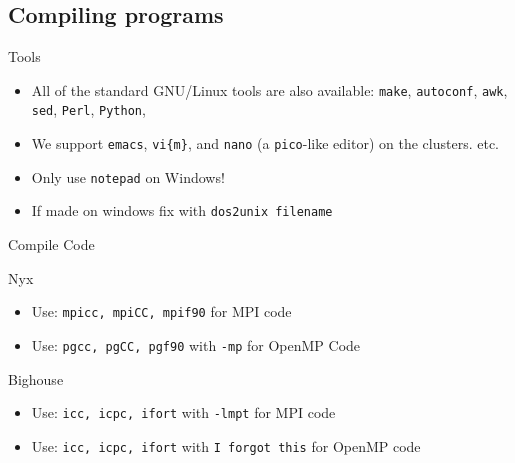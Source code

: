 \documentclass{beamer}
\begin{document}
  \subsection{Compiling programs}
  \begin{frame}{Tools}
    \begin{itemize}
    \item<1- > All of the standard GNU/Linux tools are also available: \texttt{make},
      \texttt{autoconf}, \texttt{awk}, \texttt{sed}, \texttt{Perl}, \texttt{Python},
    \item<2- > We support \texttt{emacs}, \texttt{vi\{m\}}, and \texttt{nano} (a 
      \texttt{pico}-like editor) on the clusters.
      etc.
    \item<3-| alert@1-> Only use \texttt{notepad} on Windows!
    \item<3-| alert@1-> If made on windows fix with \texttt{dos2unix filename}
    \end{itemize}
  \end{frame}
  \begin{frame}{Compile Code}
   \begin{block}{Nyx}
   \begin{itemize}
    \item Use: \texttt{mpicc, mpiCC, mpif90} for MPI code
    \item Use: \texttt{pgcc, pgCC, pgf90} with \texttt{-mp} for OpenMP Code
   \end{itemize}
   \end{block}
   \begin{block}{Bighouse}
    \begin{itemize}
     \item Use: \texttt{icc, icpc, ifort} with \texttt{-lmpt} for MPI code
     \item Use: \texttt{icc, icpc, ifort} with \texttt{\alert{I forgot this}} for OpenMP code
    \end{itemize}
   \end{block}
  \end{frame}
\end{document}
